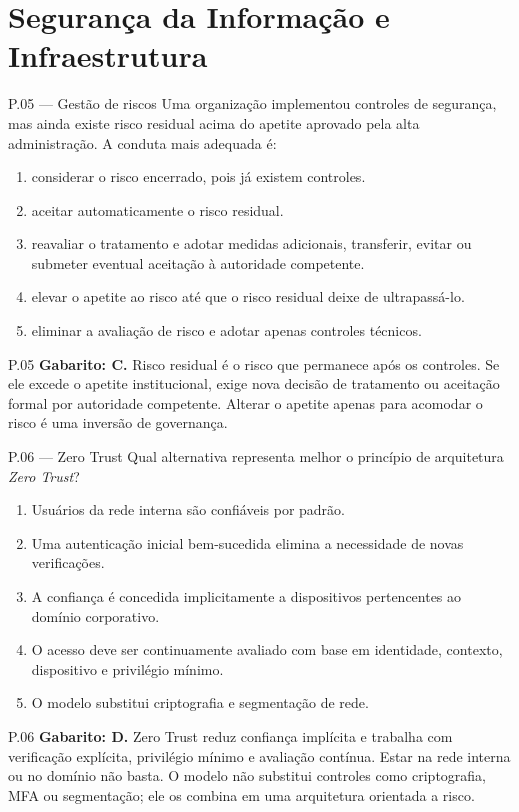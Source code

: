 \section{Segurança da Informação e Infraestrutura}

\begin{questao}{ P.05 — Gestão de riscos}
Uma organização implementou controles de segurança, mas ainda existe risco residual acima do apetite aprovado pela alta administração. A conduta mais adequada é:
\begin{enumerate}[label=\Alph*)]
\item considerar o risco encerrado, pois já existem controles.
\item aceitar automaticamente o risco residual.
\item reavaliar o tratamento e adotar medidas adicionais, transferir, evitar ou submeter eventual aceitação à autoridade competente.
\item elevar o apetite ao risco até que o risco residual deixe de ultrapassá-lo.
\item eliminar a avaliação de risco e adotar apenas controles técnicos.
\end{enumerate}
\end{questao}
\begin{solucao}{P.05}
\textbf{Gabarito: C.} Risco residual é o risco que permanece após os controles. Se ele excede o apetite institucional, exige nova decisão de tratamento ou aceitação formal por autoridade competente. Alterar o apetite apenas para acomodar o risco é uma inversão de governança.
\end{solucao}

\begin{questao}{ P.06 — Zero Trust}
Qual alternativa representa melhor o princípio de arquitetura \textit{Zero Trust}?
\begin{enumerate}[label=\Alph*)]
\item Usuários da rede interna são confiáveis por padrão.
\item Uma autenticação inicial bem-sucedida elimina a necessidade de novas verificações.
\item A confiança é concedida implicitamente a dispositivos pertencentes ao domínio corporativo.
\item O acesso deve ser continuamente avaliado com base em identidade, contexto, dispositivo e privilégio mínimo.
\item O modelo substitui criptografia e segmentação de rede.
\end{enumerate}
\end{questao}
\begin{solucao}{P.06}
\textbf{Gabarito: D.} Zero Trust reduz confiança implícita e trabalha com verificação explícita, privilégio mínimo e avaliação contínua. Estar na rede interna ou no domínio não basta. O modelo não substitui controles como criptografia, MFA ou segmentação; ele os combina em uma arquitetura orientada a risco.
\end{solucao}

